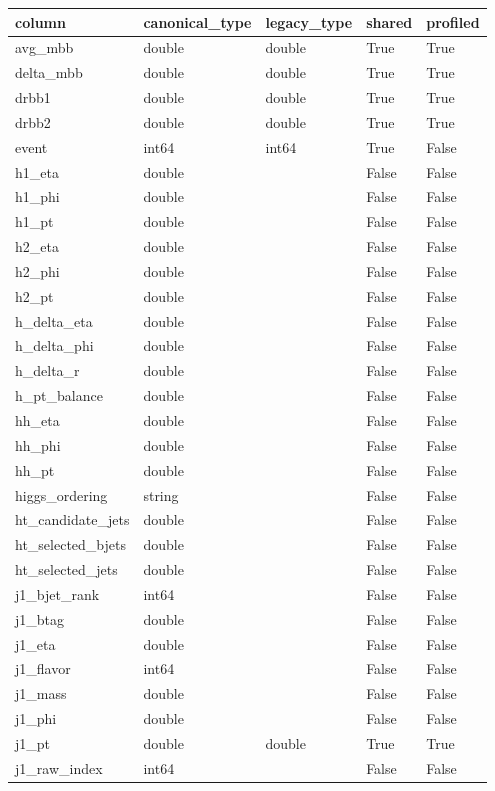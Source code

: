 \begin{tabular}{lllll}
\toprule
column & canonical\_type & legacy\_type & shared & profiled \\
\midrule
avg\_mbb & double & double & True & True \\
delta\_mbb & double & double & True & True \\
drbb1 & double & double & True & True \\
drbb2 & double & double & True & True \\
event & int64 & int64 & True & False \\
h1\_eta & double &  & False & False \\
h1\_phi & double &  & False & False \\
h1\_pt & double &  & False & False \\
h2\_eta & double &  & False & False \\
h2\_phi & double &  & False & False \\
h2\_pt & double &  & False & False \\
h\_delta\_eta & double &  & False & False \\
h\_delta\_phi & double &  & False & False \\
h\_delta\_r & double &  & False & False \\
h\_pt\_balance & double &  & False & False \\
hh\_eta & double &  & False & False \\
hh\_phi & double &  & False & False \\
hh\_pt & double &  & False & False \\
higgs\_ordering & string &  & False & False \\
ht\_candidate\_jets & double &  & False & False \\
ht\_selected\_bjets & double &  & False & False \\
ht\_selected\_jets & double &  & False & False \\
j1\_bjet\_rank & int64 &  & False & False \\
j1\_btag & double &  & False & False \\
j1\_eta & double &  & False & False \\
j1\_flavor & int64 &  & False & False \\
j1\_mass & double &  & False & False \\
j1\_phi & double &  & False & False \\
j1\_pt & double & double & True & True \\
j1\_raw\_index & int64 &  & False & False \\

\end{tabular}
